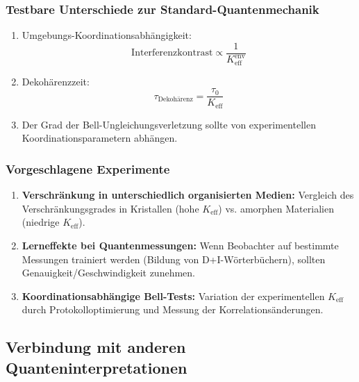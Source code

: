 \documentclass[11pt,a4paper]{article}
\begin{document}
	\subsubsection{Testbare Unterschiede zur Standard-Quantenmechanik}
	\begin{enumerate}
		\item Umgebungs-Koordinationsabhängigkeit:
		\begin{equation}
			\text{Interferenzkontrast} \propto \frac{1}{K_{\mathrm{eff}}^{\text{env}}}
		\end{equation}
		
		\item Dekohärenzzeit:
		\begin{equation}
			\tau_{\text{Dekohärenz}} = \frac{\tau_0}{K_{\mathrm{eff}}}
		\end{equation}
		
		\item Der Grad der Bell-Ungleichungsverletzung sollte von experimentellen Koordinationsparametern abhängen.
	\end{enumerate}
	
	\subsubsection{Vorgeschlagene Experimente}
	\begin{enumerate}
		\item \textbf{Verschränkung in unterschiedlich organisierten Medien:} Vergleich des Verschränkungsgrades in Kristallen (hohe $K_{\mathrm{eff}}$) vs. amorphen Materialien (niedrige $K_{\mathrm{eff}}$).
		
		\item \textbf{Lerneffekte bei Quantenmessungen:} Wenn Beobachter auf bestimmte Messungen trainiert werden (Bildung von D+I-Wörterbüchern), sollten Genauigkeit/Geschwindigkeit zunehmen.
		
		\item \textbf{Koordinationsabhängige Bell-Tests:} Variation der experimentellen $K_{\mathrm{eff}}$ durch Protokolloptimierung und Messung der Korrelationsänderungen.
	\end{enumerate}
	
	\subsection{Verbindung mit anderen Quanteninterpretationen}
	\label{subsec:interpretations}
	
\end{document}
